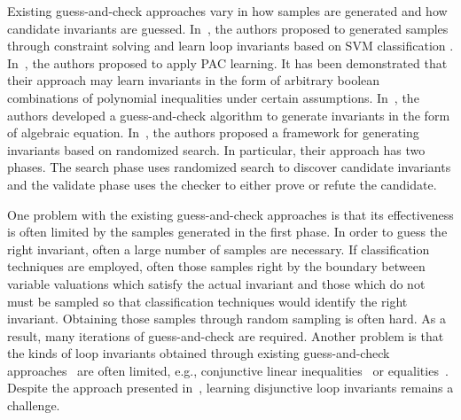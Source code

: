 Existing guess-and-check approaches vary in how samples are generated and how candidate invariants are guessed. In~\cite{sharma2012interpolants}, the authors proposed to generated samples through constraint solving and learn loop invariants based on SVM classification . In~\cite{sharma2013verification}, the authors proposed to apply PAC learning. It has been demonstrated that their approach may learn invariants in the form of arbitrary boolean
combinations of polynomial inequalities under certain assumptions. In~\cite{DBLP:conf/esop/0001GHALN13},
the authors developed a guess-and-check algorithm to generate invariants in the form of algebraic equation.
In~\cite{sharma2014invariant}, the authors proposed a framework for generating invariants based on randomized search.
In particular, their approach has two phases. The search phase uses randomized search to discover candidate invariants and the validate phase uses the checker to either prove or refute the candidate.

One problem with the existing guess-and-check approaches is that its effectiveness is often limited by the samples generated in the first phase. In order to guess the right invariant, often a large number of samples are necessary.
If classification techniques are employed, often those samples right by the boundary between variable valuations which satisfy the actual invariant and those which do not must be sampled so that classification techniques would identify the right invariant. Obtaining those samples through random sampling is often hard. As a result, many iterations of guess-and-check are required. Another problem is that the kinds of loop invariants obtained through existing guess-and-check approaches~\cite{sharma2012interpolants,sharma2013verification,DBLP:conf/esop/0001GHALN13,sharma2014invariant} are often limited, e.g., conjunctive linear inequalities~\cite{sharma2012interpolants} or equalities~\cite{DBLP:conf/esop/0001GHALN13}. Despite the approach presented in~\cite{DBLP:conf/pldi/GulwaniSV08,DBLP:conf/cav/SharmaDDA11}, learning disjunctive loop invariants remains a challenge.

